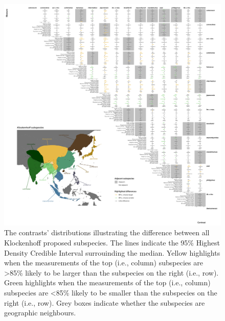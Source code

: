 \documentclass[10pt,a4paper]{article}
\begin{document}
\begin{figure}
\includegraphics[width=0.9\linewidth]{../Figures/klockSpecies_HDCI_contrasts} \caption{The contrasts' distributions illustrating the difference between all Klockenhoff proposed subspecies. The lines indicate the 95\% Highest Density Credible Interval surrouinding the median. Yellow highlights when the measurements of the top (i.e., column) subspecies are >85\% likely to be larger than the subspecies on the right (i.e., row). Green highlights when the measurements of the top (i.e., column) subspecies are <85\% likely to be smaller than the subspecies on the right (i.e., row). Grey boxes indicate whether the subspecies are geographic neighbours.}\label{fig:klockContrasts}
\end{figure}
\end{document}
